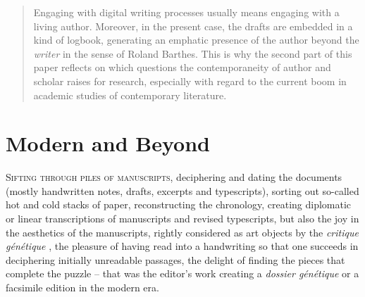 \begin{paper}
\begin{abstract}
Engaging with digital writing processes usually means engaging with a
living author. Moreover, in the present case, the drafts are embedded in
a kind of logbook, generating an emphatic presence of the author beyond
the \emph{writer} in the sense of Roland Barthes. This is why the
second part of this paper reflects on which questions the
contemporaneity of author and scholar raises for research, especially
with regard to the current boom in academic studies of contemporary
literature.
\end{abstract}

\section*{Modern and Beyond} 

\textsc{Sifting through piles of manuscripts}, deciphering and dating the
documents (mostly handwritten notes, drafts, excerpts and typescripts),
sorting out so-called hot and cold stacks of paper, reconstructing the
chronology, creating diplomatic or linear transcriptions of manuscripts
and revised typescripts, but also the joy in the aesthetics of the
manuscripts, rightly considered as art objects by the \emph{critique
génétique} \citep[157]{gresillon_literarische_1999}, the pleasure of having read into a
handwriting so that one succeeds in deciphering initially unreadable
passages, the delight of finding the pieces that complete the puzzle --
that was the editor's work creating a \emph{dossier génétique} or a
facsimile edition in the modern era.


\end{paper}
